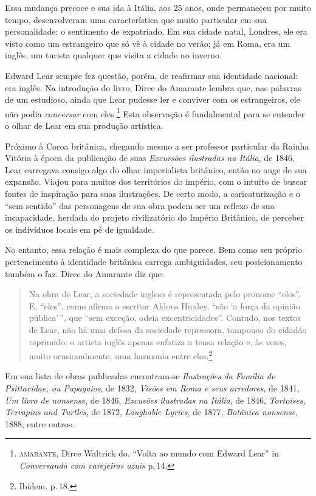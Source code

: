 \documentclass[11pt]{extarticle}
\begin{document}
Essa mudança precoce e sua ida à Itália, aos 25 anos,
onde permaneceu por muito tempo, desenvolveram uma característica
que muito particular em sua personalidade: o sentimento de 
expatriado. Em sua cidade natal, Londres, ele era visto como um 
estrangeiro que só vê à cidade no verão; já em Roma, era um inglês, 
um turista qualquer que visita a cidade no inverno. 

Edward Lear sempre fez questão, porém, de reafirmar sua identidade nacional:
era inglês. Na introdução do livro, Dirce do Amarante lembra que,
nas palavras de um estudioso, ainda que Lear pudesse ler e conviver com
os estrangeiros, ele não podia \textit{conversar} com eles.\footnote{\textsc{amarante}, 
Dirce Waltrick do. ``Volta ao mundo com Edward Lear'' in \textit{Conversando com varejeiras azuis} p.\,14.} 
Esta observação é fundalmental para se entender o olhar de Lear em sua 
produção artística. 

Próximo à Coroa britânica, chegando mesmo a ser professor particular
da Rainha Vitória à época da publicação de suas \textit{Excursões ilustradas na Itália}, de 1846,
Lear carregava consigo algo do olhar imperialista britânico, então no
auge de sua expansão. Viajou para muitos dos territórios do império,
com o intuito de buscar fontes de inspiração para suas ilustrações. 
De certo modo, a caricaturização e o ``sem sentido'' das personagens 
de sua obra podem ser um reflexo de sua incapacidade, herdada do projeto civilizatório 
do Império Britânico, de perceber os indivíduos locais em pé de igualdade. 

No entanto, essa relação é mais complexa do que parece. Bem como seu próprio 
pertencimento à identidade britânica carrega ambiguidades, seu posicionamento 
também o faz. Dirce do Amarante diz que:

\begin{quote}

Na obra de Lear, a sociedade inglesa é representada pelo pronome ``eles''. E, ``eles'', 
como afirma o escritor Aldous Huxley, ``são `a força da opinião pública'\,'', que ``sem exceção, 
odeia excentricidades''.
Contudo, nos textos de Lear, não há uma defesa da sociedade repressora, tampouco do cidadão 
reprimido; o artista inglês apenas enfatiza a tensa relação e, às vezes, muito ocasionalmente, 
uma harmonia entre eles.\footnote{Ibidem. p.\,18.}

\end{quote}

Em sua lista de obras publicadas encontram-se \textit{Ilustrações da Família de Psittacidae, ou Papagaios}, de 1832,
\textit{Visões em Roma e seus arredores}, de 1841, \textit{Um livro de \emph{nonsense}}, de 1846,
\textit{Excusões ilustradas na Itália}, de 1846, \textit{Tortoises, Terrapins and Turtles}, de 1872,
\textit{Laughable Lyrics}, de 1877, \textit{Botânica \emph{nonsense}}, 1888, entre outros.
\end{document}
